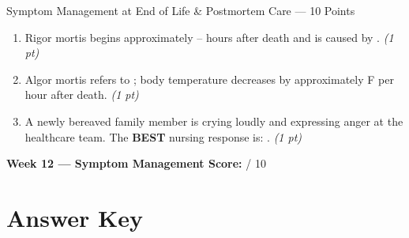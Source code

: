 \documentclass[11pt,letterpaper]{article}
\newcommand{\blank}[1][3cm]{\underline{\hspace{#1}}}
\begin{document}
\begin{diagbox}{Symptom Management at End of Life \& Postmortem Care --- 10 Points}
\begin{enumerate}[leftmargin=1.5em, label=\textbf{\arabic*.},start=161]
  \item Rigor mortis begins approximately \blank[2cm]--\blank[2cm] hours
        after death and is caused by \blank[5cm].
        \hfill\textit{(1 pt)}

  \item Algor mortis refers to \blank[4cm]; body temperature decreases by
        approximately \blank[2cm]\textdegree F per hour after death.
        \hfill\textit{(1 pt)}

  \item A newly bereaved family member is crying loudly and expressing anger at the
        healthcare team.  The \textbf{BEST} nursing response is:
        \blank[8cm].
        \hfill\textit{(1 pt)}

\end{enumerate}

\vspace{0.3cm}
\textbf{Week 12 --- Symptom Management Score:} \blank[1cm] / 10
\end{diagbox}

\newpage

\section{Answer Key}
\end{document}
